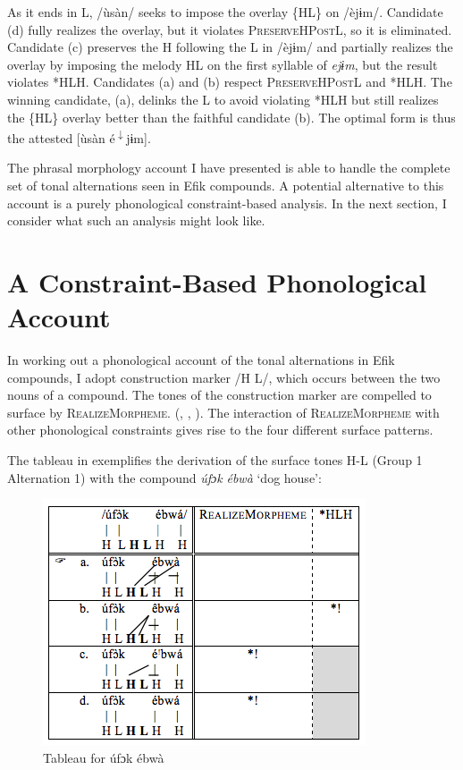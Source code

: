 \documentclass[output=paper]{langscibook}
\begin{document}
As it ends in L, /ùsàn/ seeks to impose the overlay \{HL\} on /èjɨm/. Candidate (d) fully realizes the overlay, but it violates \textsc{PreserveHPostL}, so it is eliminated. Candidate (c) preserves the H following the L in /èjɨm/ and partially realizes the overlay by imposing the melody HL on the first syllable of \textit{ejɨm}, but the result violates *HLH. Candidates (a) and (b) respect \textsc{PreserveHPostL} and *HLH. The winning candidate, (a), delinks the L to avoid violating *HLH but still realizes the \{HL\} overlay better than the faithful candidate (b). The optimal form is thus the attested [ùsàn é\textsuperscript{$\downarrow$}jɨm]. 

The phrasal morphology account I have presented is able to handle the complete set of tonal alternations seen in Efik compounds. A potential alternative to this account is a purely phonological constraint-based analysis. In the next section, I consider what such an analysis might look like. 
 
\section{A Constraint-Based Phonological Account}

In working out a phonological account of the tonal alternations in Efik compounds, I adopt  construction marker /H L/, which occurs between the two nouns of a compound. The tones of the construction marker are compelled to surface by \textsc{RealizeMorpheme}. (\citealt{Gnanadesikan1997}, \citealt{Kurisu2001}, \citealt{Oostendorp2005}). The interaction of \textsc{RealizeMorpheme} with other phonological constraints gives rise to the four different surface patterns. 

The tableau in  exemplifies the derivation of the surface tones H-L (Group 1 Alternation 1) with the compound \textit{úfɔk} \textit{ébwà} ‘dog house’: 

\begin{figure}
\includegraphics[width=\textwidth]{figures/glewwe-img6.png}
\caption{Tableau for \textup{úfɔk ébwà}}
\label{fig:glewwe:7}
\end{figure}
\end{document}
